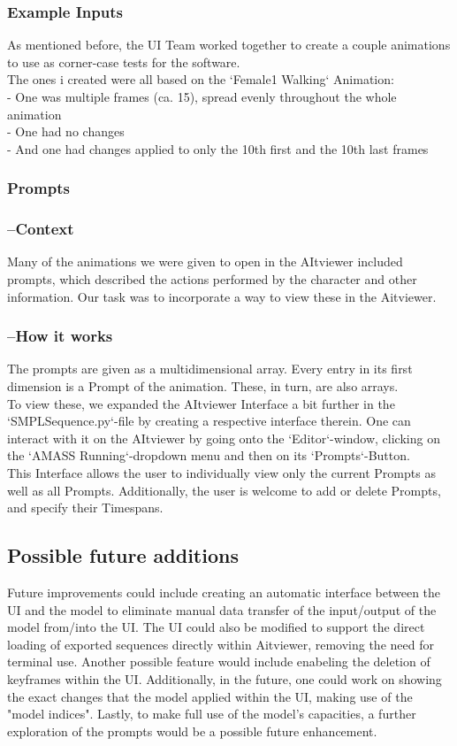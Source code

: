 \documentclass[a4paper]{scrartcl}
\begin{document}
\subsubsection*{Example Inputs}
As mentioned before, the UI Team worked together to create a couple animations to use as corner-case tests for the software.\\
The ones i created were all based on the `Female1 Walking` Animation:\\
- One was multiple frames (ca. 15), spread evenly throughout the whole animation\\
- One had no changes\\
- And one had changes applied to only the 10th first and the 10th last frames\\

\subsubsection*{Prompts}
\subsubsection*{--Context}
Many of the animations we were given to open in the AItviewer included prompts, which described the actions performed by the character and other information. Our task was to incorporate a way to view these in the Aitviewer.

\subsubsection*{--How it works}
The prompts are given as a multidimensional array. Every entry in its first dimension is a Prompt of the animation. These, in turn, are also arrays.\\
To view these, we expanded the AItviewer Interface a bit further in the `SMPLSequence.py`-file by creating a respective interface therein. One can interact with it on the AItviewer by going onto the `Editor`-window, clicking on the `AMASS Running`-dropdown menu and then on its `Prompts`-Button.\\
This Interface allows the user to individually view only the current Prompts as well as all Prompts. Additionally, the user is welcome to add or delete Prompts, and specify their Timespans.


\subsection*{Possible future additions}
Future improvements could include creating an automatic interface between the UI and the model to eliminate manual data transfer of the input/output of the model from/into the UI. The UI could also be modified to support the direct loading of exported sequences directly within Aitviewer, removing the need for terminal use. Another possible feature would include enabeling the deletion of keyframes within the UI. Additionally, in the future, one could work on showing the exact changes that the model applied within the UI, making use of the "model indices". Lastly, to make full use of the model's capacities, a further exploration of the prompts would be a possible future enhancement.
\end{document}
